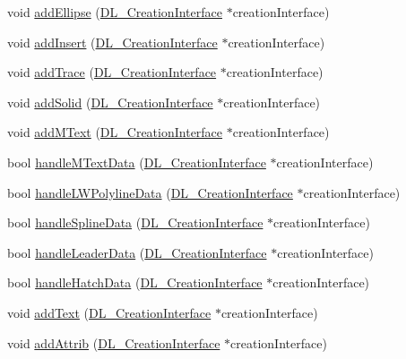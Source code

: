 \begin{DoxyCompactItemize}
\item 
void \hyperlink{classDL__Jww_a184d596b538825525ce5301cba9cb89e}{add\-Ellipse} (\hyperlink{classDL__CreationInterface}{D\-L\-\_\-\-Creation\-Interface} $\ast$creation\-Interface)
\item 
void \hyperlink{classDL__Jww_a1a76a7e3e93dff3320472b81fd083a8a}{add\-Insert} (\hyperlink{classDL__CreationInterface}{D\-L\-\_\-\-Creation\-Interface} $\ast$creation\-Interface)
\item 
void \hyperlink{classDL__Jww_af7f4691ea21313ebd679965461af750d}{add\-Trace} (\hyperlink{classDL__CreationInterface}{D\-L\-\_\-\-Creation\-Interface} $\ast$creation\-Interface)
\item 
void \hyperlink{classDL__Jww_a9a23b3106508562afc648f03b7275d9c}{add\-Solid} (\hyperlink{classDL__CreationInterface}{D\-L\-\_\-\-Creation\-Interface} $\ast$creation\-Interface)
\item 
void \hyperlink{classDL__Jww_a958e6554d2b62ee953a86721b0558b52}{add\-M\-Text} (\hyperlink{classDL__CreationInterface}{D\-L\-\_\-\-Creation\-Interface} $\ast$creation\-Interface)
\item 
bool \hyperlink{classDL__Jww_ac8f27defc2e61d310f17bd2b8ecc54f2}{handle\-M\-Text\-Data} (\hyperlink{classDL__CreationInterface}{D\-L\-\_\-\-Creation\-Interface} $\ast$creation\-Interface)
\item 
bool \hyperlink{classDL__Jww_a36c6c0ca2b9df638e72204ea028b9290}{handle\-L\-W\-Polyline\-Data} (\hyperlink{classDL__CreationInterface}{D\-L\-\_\-\-Creation\-Interface} $\ast$creation\-Interface)
\item 
bool \hyperlink{classDL__Jww_aa5f8dbcc6ea9f102fd8a49aa736c73bd}{handle\-Spline\-Data} (\hyperlink{classDL__CreationInterface}{D\-L\-\_\-\-Creation\-Interface} $\ast$creation\-Interface)
\item 
bool \hyperlink{classDL__Jww_a9d496ac42563373a3e4d4893764cb9b8}{handle\-Leader\-Data} (\hyperlink{classDL__CreationInterface}{D\-L\-\_\-\-Creation\-Interface} $\ast$creation\-Interface)
\item 
bool \hyperlink{classDL__Jww_a233bc4b34189839f73298cb7133d949c}{handle\-Hatch\-Data} (\hyperlink{classDL__CreationInterface}{D\-L\-\_\-\-Creation\-Interface} $\ast$creation\-Interface)
\item 
void \hyperlink{classDL__Jww_a363455add370595edf87f35b62dcf486}{add\-Text} (\hyperlink{classDL__CreationInterface}{D\-L\-\_\-\-Creation\-Interface} $\ast$creation\-Interface)
\item 
void \hyperlink{classDL__Jww_a17c123f29e2ac263c92a1726080bacbc}{add\-Attrib} (\hyperlink{classDL__CreationInterface}{D\-L\-\_\-\-Creation\-Interface} $\ast$creation\-Interface)

\end{DoxyCompactItemize}
